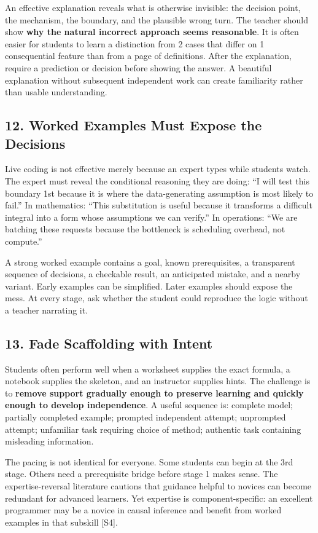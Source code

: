 An effective explanation reveals what is otherwise invisible: the decision point, the mechanism, the boundary, and the plausible wrong turn. The teacher should show \textbf{why the natural incorrect approach seems reasonable}. It is often easier for students to learn a distinction from 2 cases that differ on 1 consequential feature than from a page of definitions. After the explanation, require a prediction or decision before showing the answer. A beautiful explanation without subsequent independent work can create familiarity rather than usable understanding.

\subsection*{12. Worked Examples Must Expose the Decisions}

Live coding is not effective merely because an expert types while students watch. The expert must reveal the conditional reasoning they are doing: ``I will test this boundary 1st because it is where the data-generating assumption is most likely to fail.'' In mathematics: ``This substitution is useful because it transforms a difficult integral into a form whose assumptions we can verify.'' In operations: ``We are batching these requests because the bottleneck is scheduling overhead, not compute.''

A strong worked example contains a goal, known prerequisites, a transparent sequence of decisions, a checkable result, an anticipated mistake, and a nearby variant. Early examples can be simplified. Later examples should expose the mess. At every stage, ask whether the student could reproduce the logic without a teacher narrating it.

\subsection*{13. Fade Scaffolding with Intent}

Students often perform well when a worksheet supplies the exact formula, a notebook supplies the skeleton, and an instructor supplies hints. The challenge is to \textbf{remove support gradually enough to preserve learning and quickly enough to develop independence}. A useful sequence is: complete model; partially completed example; prompted independent attempt; unprompted attempt; unfamiliar task requiring choice of method; authentic task containing misleading information.

The pacing is not identical for everyone. Some students can begin at the 3rd stage. Others need a prerequisite bridge before stage 1 makes sense. The expertise-reversal literature cautions that guidance helpful to novices can become redundant for advanced learners. Yet expertise is component-specific: an excellent programmer may be a novice in causal inference and benefit from worked examples in that subskill [S4].

